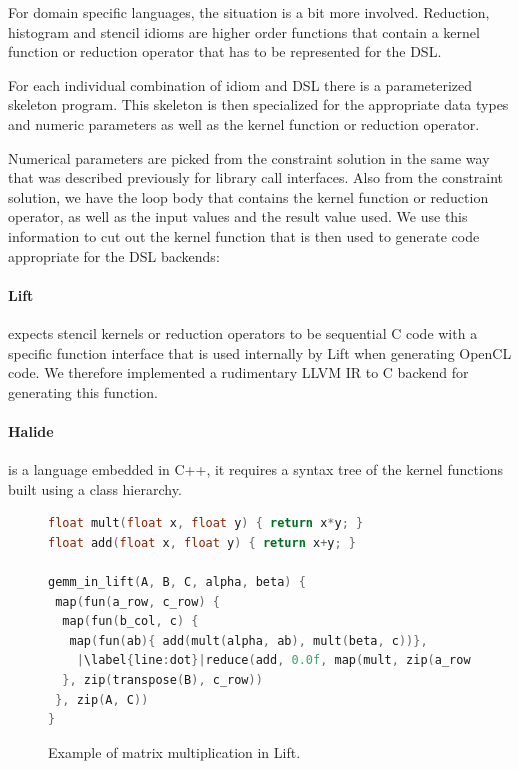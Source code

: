    For domain specific languages, the situation is a bit more involved.
    Reduction, histogram and stencil idioms are higher order functions that
    contain a kernel function or reduction operator that has to be represented
    for the DSL.

    For each individual combination of idiom and DSL there is a parameterized
    skeleton program.
    This skeleton is then specialized for the appropriate data types and numeric
    parameters as well as the kernel function or reduction operator.

    Numerical parameters are picked from the constraint solution in the same way
    that was described previously for library call interfaces.
    Also from the constraint solution, we have the loop body that contains the
    kernel function or reduction operator, as well as the input values and the
    result value used.
    We use this information to cut out the kernel function that is then used to
    generate code appropriate for the DSL backends:

\pagebreak
\paragraph{Lift}  expects stencil kernels or reduction operators to be sequential C code with a specific function interface that
is used internally by Lift when generating OpenCL code.
We therefore implemented a rudimentary LLVM IR to C backend for generating this function.

\paragraph{Halide} is a language embedded in C++, it requires a syntax tree of the kernel functions built using a class hierarchy.

\begin{figure}[ht]
\begin{lstlisting}[language=C,escapechar=|]
float mult(float x, float y) { return x*y; }
float add(float x, float y) { return x+y; }

gemm_in_lift(A, B, C, alpha, beta) {
 map(fun(a_row, c_row) {
  map(fun(b_col, c) {
   map(fun(ab){ add(mult(alpha, ab), mult(beta, c))},
    |\label{line:dot}|reduce(add, 0.0f, map(mult, zip(a_row, b_col))))
  }, zip(transpose(B), c_row))
 }, zip(A, C))
}
\end{lstlisting}
\vspace{-.3cm}
\caption{Example of matrix multiplication in Lift.}
\label{fig:liftmxm}
\vspace{-1em}
\end{figure}

